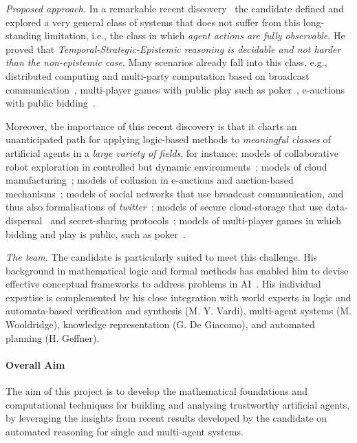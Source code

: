 \documentclass[a4paper,12pt]{scrartcl}
\def\TSE{Temporal-Strategic-Epistemic\xspace}
\begin{document}
\emph{Proposed approach.}
In a remarkable recent discovery~\cite{BLMR17IJCAI,BLMR17} the candidate defined and explored a very general class of systems that does not suffer from this long-standing limitation, i.e., the class in which \emph{agent actions are fully observable}. He proved that \emph{\TSE reasoning is decidable and not harder than the non-epistemic case}. Many scenarios already fall into this class, e.g., distributed computing and multi-party computation based on broadcast communication~\cite{DBLP:books/mk/Lynch96, ADGH06}, multi-player games with public play such as poker~\cite{Bowling145}, e-auctions with public bidding~\cite{EasleyK10}. 

Moreover, the importance of this recent discovery is that it charts an unanticipated path for applying logic-based methods to 
\emph{meaningful classes} of artificial agents in a \emph{large variety of fields}, for instance: models of collaborative robot exploration in controlled but dynamic environments~\cite{amazon};  models of cloud manufacturing~\cite{DBLP:conf/ijcai/FelliSLR17};  models of collusion in e-auctions and auction-based mechanisms~\cite{EasleyK10};  models of social networks that use broadcast communication, and thus also formalisations of \emph{twitter}~\cite{DeNicola2015,DBLP:journals/jlp/MaggiPST17};  models of secure cloud-storage that use data-dispersal~\cite{DBLP:journals/internet/LiQLL16} and secret-sharing protocols~\cite{ADGH06};  models of multi-player games in which bidding and play is public, such as poker~\cite{Bowling145}.

\emph{The team.} The candidate is particularly suited to meet this challenge. His background in mathematical logic and formal methods has enabled him to devise effective conceptual frameworks to address problems in AI~\cite{DBLP:conf/atal/Rubin15,DBLP:conf/kr/AminofMRZ16,DeGiacomoMRS16,DBLP:conf/atal/AminofMMR16,BDGR17,GMPRW17,BDGR17,BLMR17IJCAI,BLMR17,BMMRV17}. His individual expertise is complemented by his close integration with world experts in logic and automata-based verification and synthesis (M. Y. Vardi), multi-agent systems (M. Wooldridge), knowledge representation (G. De Giacomo), and automated planning (H. Geffner).





\paragraph{Overall Aim} The aim of this project is to develop the mathematical foundations and computational techniques for building and analysing 
trustworthy artificial agents, by leveraging the insights from recent results developed by the candidate on automated reasoning for single and multi-agent systems.
\end{document}
